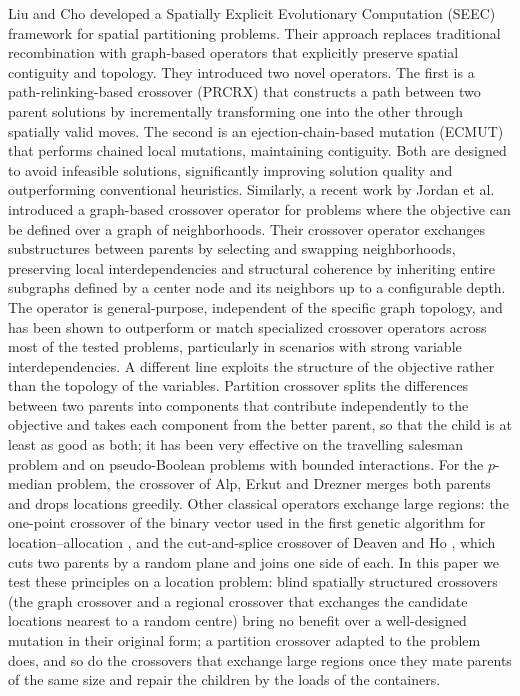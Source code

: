 Liu and Cho \cite{liu2020spatially} developed a Spatially Explicit Evolutionary Computation (SEEC) framework for spatial partitioning problems. Their approach replaces traditional recombination with graph-based operators that explicitly preserve spatial contiguity and topology. They introduced two novel operators. The first is a path-relinking-based crossover (PRCRX) that constructs a path between two parent solutions by incrementally transforming one into the other through spatially valid moves. The second is an ejection-chain-based mutation (ECMUT) that performs chained local mutations, maintaining contiguity. Both are designed to avoid infeasible solutions, significantly improving solution quality and outperforming conventional heuristics. Similarly, a recent work by Jordan et al. \cite{jordan2025crossover} introduced a graph-based crossover operator for problems where the objective can be defined over a graph of neighborhoods. Their crossover operator exchanges substructures between parents by selecting and swapping neighborhoods, preserving local interdependencies and structural coherence by inheriting entire subgraphs defined by a center node and its neighbors up to a configurable depth. The operator is general-purpose, independent of the specific graph topology, and has been shown to outperform or match specialized crossover operators across most of the tested problems, particularly in scenarios with strong variable interdependencies. A different line exploits the structure of the objective rather than the topology of the variables. Partition crossover \cite{whitley2009tunneling,tinos2015partition} splits the differences between two parents into components that contribute independently to the objective and takes each component from the better parent, so that the child is at least as good as both; it has been very effective on the travelling salesman problem and on pseudo-Boolean problems with bounded interactions. For the $p$-median problem, the crossover of Alp, Erkut and Drezner \cite{alp2003efficient} merges both parents and drops locations greedily. Other classical operators exchange large regions: the one-point crossover of the binary vector used in the first genetic algorithm for location--allocation \cite{hosage1986discrete}, and the cut-and-splice crossover of Deaven and Ho \cite{deaven1995molecular}, which cuts two parents by a random plane and joins one side of each. In this paper we test these principles on a location problem: blind spatially structured crossovers (the graph crossover and a regional crossover that exchanges the candidate locations nearest to a random centre) bring no benefit over a well-designed mutation in their original form; a partition crossover adapted to the problem does, and so do the crossovers that exchange large regions once they mate parents of the same size and repair the children by the loads of the containers.

